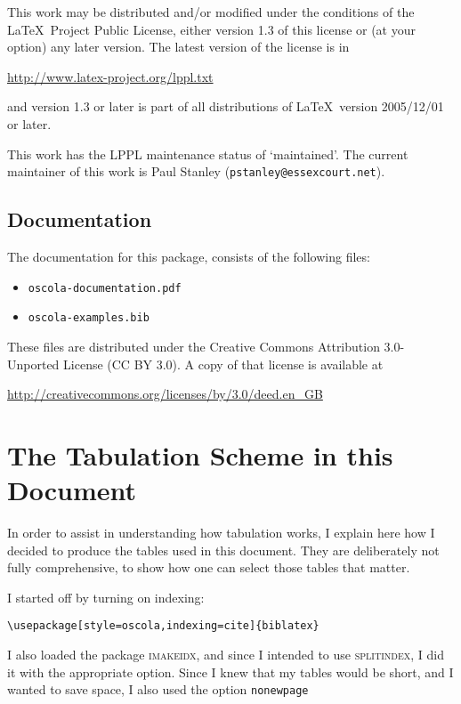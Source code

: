 \documentclass[a5paper,fontsize=9pt,DIV=1]{scrartcl}
\begin{document}
This work may be distributed and\slash or modified under the conditions of the \LaTeX\ Project Public License, either version 1.3 of this license or (at your option) any later version. The latest version of the license is in
\begin{center}
\url{http://www.latex-project.org/lppl.txt}
\end{center}
and version 1.3 or later is part of all distributions of \LaTeX\ version 2005\slash 12\slash 01 or later.

This work has the LPPL maintenance status of `maintained'. The current maintainer of this work is Paul Stanley (\texttt{pstanley@essexcourt.net}).

\subsection{Documentation}

The documentation for this package, consists of the following files:
\begin{itemize}
\item \texttt{oscola-documentation.pdf}
\item \texttt{oscola-examples.bib}
\end{itemize}

These files are distributed under the Creative Commons Attribution 3.0-Unported License (CC BY 3.0). A copy of that license is available at
\begin{center}
\url{http://creativecommons.org/licenses/by/3.0/deed.en_GB}
\end{center}

\section{The Tabulation Scheme in this Document}

In order to assist in understanding how tabulation works, I explain here how I decided to produce the tables used in this document. They are deliberately not fully comprehensive, to show how one can select those tables that matter.

I started off by turning on indexing:

\begin{verbatim}
\usepackage[style=oscola,indexing=cite]{biblatex}
\end{verbatim}

I also loaded the package \textsc{imakeidx}, and since I intended to use \textsc{splitindex}, I did it with the appropriate option. Since I knew that my tables would be short, and I wanted to save space, I also used the option \verb|nonewpage|
\end{document}
